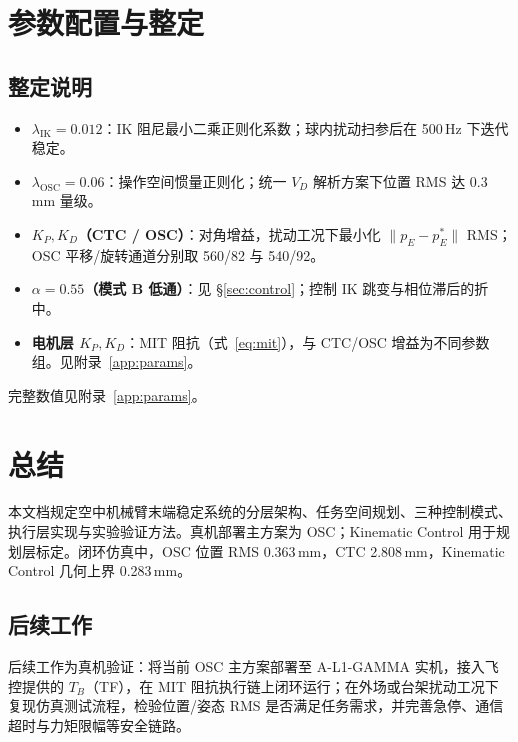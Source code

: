 \documentclass[UTF8, a4paper, 12pt]{ctexart}
\begin{document}
\section{参数配置与整定}

\subsection{整定说明}

\begin{itemize}[leftmargin=2em]
    \item \textbf{$\lambda_{\mathrm{IK}}=0.012$}：IK 阻尼最小二乘正则化系数；球内扰动扫参后在 500\,Hz 下迭代稳定。
    \item \textbf{$\lambda_{\mathrm{OSC}}=0.06$}：操作空间惯量正则化；统一 $V_D$ 解析方案下位置 RMS 达 0.3\,mm 量级。
    \item \textbf{$K_P,K_D$（CTC / OSC）}：对角增益，扰动工况下最小化 $\|p_E-p_E^*\|$ RMS；OSC 平移/旋转通道分别取 560/82 与 540/92。
    \item \textbf{$\alpha=0.55$（模式 B 低通）}：见 \S\ref{sec:control}；控制 IK 跳变与相位滞后的折中。
    \item \textbf{电机层 $K_P,K_D$}：MIT 阻抗（式~\eqref{eq:mit}），与 CTC/OSC 增益为不同参数组。见附录~\ref{app:params}。
\end{itemize}

完整数值见附录~\ref{app:params}。

\section{总结}

本文档规定空中机械臂末端稳定系统的分层架构、任务空间规划、三种控制模式、执行层实现与实验验证方法。真机部署主方案为 OSC；Kinematic Control 用于规划层标定。闭环仿真中，OSC 位置 RMS 0.363\,mm，CTC 2.808\,mm，Kinematic Control 几何上界 0.283\,mm。

\subsection{后续工作}

后续工作为真机验证：将当前 OSC 主方案部署至 A-L1-GAMMA 实机，接入飞控提供的 $T_B$（TF），在 MIT 阻抗执行链上闭环运行；在外场或台架扰动工况下复现仿真测试流程，检验位置/姿态 RMS 是否满足任务需求，并完善急停、通信超时与力矩限幅等安全链路。
\end{document}
